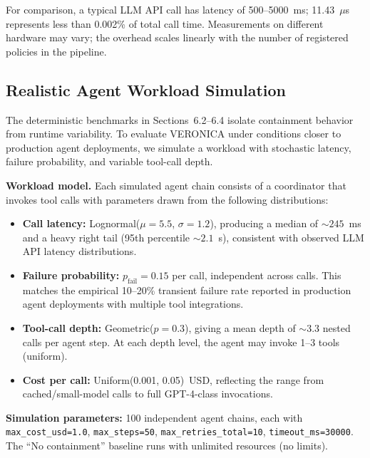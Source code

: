 \documentclass[11pt]{article}
\begin{document}
For comparison, a typical LLM API call has latency of 500--5000~ms;
11.43~$\mu$s represents less than 0.002\% of total call time. Measurements
on different hardware may vary; the overhead scales linearly with the number
of registered policies in the pipeline.

\subsection{Realistic Agent Workload Simulation}

The deterministic benchmarks in Sections~6.2--6.4 isolate containment
behavior from runtime variability. To evaluate VERONICA under conditions
closer to production agent deployments, we simulate a workload with stochastic
latency, failure probability, and variable tool-call depth.

\textbf{Workload model.} Each simulated agent chain consists of a coordinator
that invokes tool calls with parameters drawn from the following
distributions:

\begin{itemize}[nosep]
  \item \textbf{Call latency:} Lognormal($\mu{=}5.5$, $\sigma{=}1.2$),
    producing a median of ${\sim}245$~ms and a heavy right tail (95th
    percentile ${\sim}2.1$~s), consistent with observed LLM API latency
    distributions.
  \item \textbf{Failure probability:} $p_{\text{fail}} = 0.15$ per call,
    independent across calls. This matches the empirical 10--20\% transient
    failure rate reported in production agent deployments with multiple tool
    integrations.
  \item \textbf{Tool-call depth:} Geometric($p{=}0.3$), giving a mean depth
    of ${\sim}3.3$ nested calls per agent step. At each depth level, the
    agent may invoke 1--3 tools (uniform).
  \item \textbf{Cost per call:} Uniform(0.001, 0.05)~USD, reflecting the
    range from cached/small-model calls to full GPT-4-class invocations.
\end{itemize}

\textbf{Simulation parameters:} 100 independent agent chains, each with
\texttt{max\_cost\_usd=1.0}, \texttt{max\_steps=50},
\texttt{max\_retries\_total=10}, \texttt{timeout\_ms=30000}. The ``No
containment'' baseline runs with unlimited resources (no limits).
\end{document}
